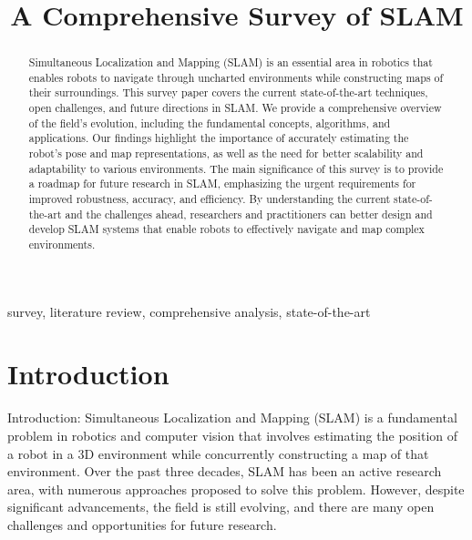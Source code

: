 \documentclass[conference]{IEEEtran}
\begin{document}
\title{A Comprehensive Survey of SLAM}
\author{
\and
{}
}

\maketitle

\begin{abstract}
 Simultaneous Localization and Mapping (SLAM) is an essential area in robotics that enables robots to navigate through uncharted environments while constructing maps of their surroundings. This survey paper covers the current state-of-the-art techniques, open challenges, and future directions in SLAM. We provide a comprehensive overview of the field's evolution, including the fundamental concepts, algorithms, and applications. Our findings highlight the importance of accurately estimating the robot's pose and map representations, as well as the need for better scalability and adaptability to various environments. The main significance of this survey is to provide a roadmap for future research in SLAM, emphasizing the urgent requirements for improved robustness, accuracy, and efficiency. By understanding the current state-of-the-art and the challenges ahead, researchers and practitioners can better design and develop SLAM systems that enable robots to effectively navigate and map complex environments.
\end{abstract}

\begin{IEEEkeywords}
survey, literature review, comprehensive analysis, state-of-the-art
\end{IEEEkeywords}


\section{Introduction}
Introduction:
Simultaneous Localization and Mapping (SLAM) is a fundamental problem in robotics and computer vision that involves estimating the position of a robot in a 3D environment while concurrently constructing a map of that environment. Over the past three decades, SLAM has been an active research area, with numerous approaches proposed to solve this problem. However, despite significant advancements, the field is still evolving, and there are many open challenges and opportunities for future research.
\end{document}
